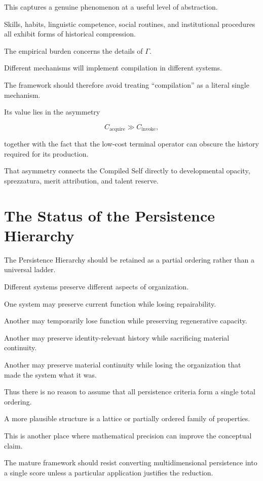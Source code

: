 \documentclass[11pt]{article}
\theoremstyle{remark}
\begin{document}
This captures a genuine phenomenon at a useful level of abstraction.

Skills, habits, linguistic competence, social routines, and institutional
procedures all exhibit forms of historical compression.

The empirical burden concerns the details of $\Gamma$.

Different mechanisms will implement compilation in different systems.

The framework should therefore avoid treating ``compilation'' as a literal
single mechanism.

Its value lies in the asymmetry

\begin{equation}
C_{\mathrm{acquire}}
\gg
C_{\mathrm{invoke}},
\end{equation}

together with the fact that the low-cost terminal operator can obscure the
history required for its production.

That asymmetry connects the Compiled Self directly to developmental opacity,
sprezzatura, merit attribution, and talent reserve.

\section{The Status of the Persistence Hierarchy}

The Persistence Hierarchy should be retained as a partial ordering rather than
a universal ladder.

Different systems preserve different aspects of organization.

One system may preserve current function while losing repairability.

Another may temporarily lose function while preserving regenerative capacity.

Another may preserve identity-relevant history while sacrificing material
continuity.

Another may preserve material continuity while losing the organization that
made the system what it was.

Thus there is no reason to assume that all persistence criteria form a single
total ordering.

A more plausible structure is a lattice or partially ordered family of
properties.

This is another place where mathematical precision can improve the conceptual
claim.

The mature framework should resist converting multidimensional persistence into
a single score unless a particular application justifies the reduction.
\end{document}
